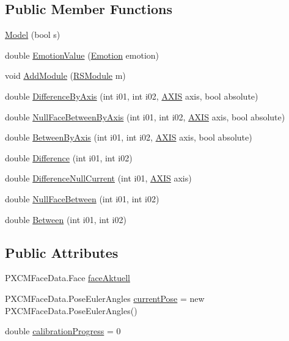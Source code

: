 \subsection*{Public Member Functions}
\begin{DoxyCompactItemize}
\item 
\hyperlink{class_real_sense_1_1_model_a39349d1d9b1274a9fe28614e9ce215f3}{Model} (bool s)
\item 
double \hyperlink{class_real_sense_1_1_model_a078b1ddb43e777aa73c1b3898722e4bb}{Emotion\+Value} (\hyperlink{class_real_sense_1_1_model_a5bf3fde8f53519f7a740d8b4e0399208}{Emotion} emotion)
\item 
void \hyperlink{class_real_sense_1_1_model_a8b8bff51e69b2b33f5c8cfb007c424e5}{Add\+Module} (\hyperlink{class_real_sense_1_1_r_s_module}{R\+S\+Module} m)
\item 
double \hyperlink{class_real_sense_1_1_model_a7f212901958598b29fabcf087fc33bdb}{Difference\+By\+Axis} (int i01, int i02, \hyperlink{class_real_sense_1_1_model_ab1d8b9992dae2162c48b52f6694f946b}{A\+X\+IS} axis, bool absolute)
\item 
double \hyperlink{class_real_sense_1_1_model_aab86ce9f3027b3fca83d11a97353154c}{Null\+Face\+Between\+By\+Axis} (int i01, int i02, \hyperlink{class_real_sense_1_1_model_ab1d8b9992dae2162c48b52f6694f946b}{A\+X\+IS} axis, bool absolute)
\item 
double \hyperlink{class_real_sense_1_1_model_abaaee5d06f75b1fb9a9d8946ebf53934}{Between\+By\+Axis} (int i01, int i02, \hyperlink{class_real_sense_1_1_model_ab1d8b9992dae2162c48b52f6694f946b}{A\+X\+IS} axis, bool absolute)
\item 
double \hyperlink{class_real_sense_1_1_model_a1d827ed6fd7d689679af4a276362128b}{Difference} (int i01, int i02)
\item 
double \hyperlink{class_real_sense_1_1_model_a69d8b360ed9c9ddaa19a0619df408e2a}{Difference\+Null\+Current} (int i01, \hyperlink{class_real_sense_1_1_model_ab1d8b9992dae2162c48b52f6694f946b}{A\+X\+IS} axis)
\item 
double \hyperlink{class_real_sense_1_1_model_a03fd4fa56ceb5cbcebdbebb4b7a78158}{Null\+Face\+Between} (int i01, int i02)
\item 
double \hyperlink{class_real_sense_1_1_model_a846e090817e3200e8c20af80094fdcc8}{Between} (int i01, int i02)
\end{DoxyCompactItemize}
\subsection*{Public Attributes}
\begin{DoxyCompactItemize}
\item 
P\+X\+C\+M\+Face\+Data.\+Face \hyperlink{class_real_sense_1_1_model_ad4e469e9cf474c5f813a757be1eaf55d}{face\+Aktuell}
\item 
P\+X\+C\+M\+Face\+Data.\+Pose\+Euler\+Angles \hyperlink{class_real_sense_1_1_model_aa6e241f22bac2dbdefdceef6e4cf0202}{current\+Pose} = new P\+X\+C\+M\+Face\+Data.\+Pose\+Euler\+Angles()
\item 
double \hyperlink{class_real_sense_1_1_model_a8573a7d01db1fb8a29f5873a717373bc}{calibration\+Progress} = 0
\end{DoxyCompactItemize}
